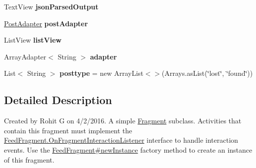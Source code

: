 \begin{DoxyCompactItemize}
\begin{DoxyCompactItemize}
\item 
\hypertarget{classcom_1_1example_1_1sel_1_1lostfound_1_1FeedFragment_a01c44ffc7184b293c7f3bbc9feb842fd}{\-Text\-View {\bfseries json\-Parsed\-Output}}\label{classcom_1_1example_1_1sel_1_1lostfound_1_1FeedFragment_a01c44ffc7184b293c7f3bbc9feb842fd}

\item 
\hypertarget{classcom_1_1example_1_1sel_1_1lostfound_1_1FeedFragment_aaa716b67058667e9283096e57d39e4a9}{\hyperlink{classcom_1_1example_1_1sel_1_1lostfound_1_1PostAdapter}{\-Post\-Adapter} {\bfseries post\-Adapter}}\label{classcom_1_1example_1_1sel_1_1lostfound_1_1FeedFragment_aaa716b67058667e9283096e57d39e4a9}

\item 
\hypertarget{classcom_1_1example_1_1sel_1_1lostfound_1_1FeedFragment_af0734f2ee44a9dcdd95b59d595e44b4c}{\-List\-View {\bfseries list\-View}}\label{classcom_1_1example_1_1sel_1_1lostfound_1_1FeedFragment_af0734f2ee44a9dcdd95b59d595e44b4c}

\item 
\hypertarget{classcom_1_1example_1_1sel_1_1lostfound_1_1FeedFragment_aa9ffcd7455b3051f27d013247d15f787}{\-Array\-Adapter$<$ \-String $>$ {\bfseries adapter}}\label{classcom_1_1example_1_1sel_1_1lostfound_1_1FeedFragment_aa9ffcd7455b3051f27d013247d15f787}

\item 
\hypertarget{classcom_1_1example_1_1sel_1_1lostfound_1_1FeedFragment_ae267efafc50372bea070ccc2cae34e6c}{\-List$<$ \-String $>$ {\bfseries posttype} = new \-Array\-List$<$$>$(\-Arrays.\-as\-List(\char`\"{}lost\char`\"{}, \char`\"{}found\char`\"{}))}\label{classcom_1_1example_1_1sel_1_1lostfound_1_1FeedFragment_ae267efafc50372bea070ccc2cae34e6c}

\end{DoxyCompactItemize}


\subsection{\-Detailed \-Description}
\-Created by \-Rohit \-G on 4/2/2016. \-A simple \hyperlink{}{\-Fragment} subclass. \-Activities that contain this fragment must implement the \hyperlink{interfacecom_1_1example_1_1sel_1_1lostfound_1_1FeedFragment_1_1OnFragmentInteractionListener}{\-Feed\-Fragment.\-On\-Fragment\-Interaction\-Listener} interface to handle interaction events. \-Use the \hyperlink{classcom_1_1example_1_1sel_1_1lostfound_1_1FeedFragment_a63f279103cc59000c74087d6addb351f}{\-Feed\-Fragment\#new\-Instance} factory method to create an instance of this fragment. 


\end{DoxyCompactItemize}

